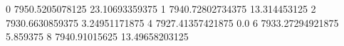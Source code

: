 0 7950.5205078125 23.10693359375
1 7940.72802734375 13.314453125
2 7930.6630859375 3.24951171875
4 7927.41357421875 0.0
6 7933.27294921875 5.859375
8 7940.91015625 13.49658203125
